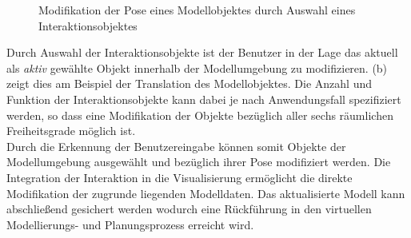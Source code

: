 \begin{figure}[!ht]
	\begin{center}
	\hspace{5mm}
	\caption{Modifikation der Pose eines Modellobjektes durch Auswahl eines Interaktionsobjektes}
	\label{fig.intarrows}
	\end{center}
\end{figure}

Durch Auswahl der Interaktionsobjekte ist der Benutzer in der Lage das aktuell als \textit{aktiv} gewählte Objekt innerhalb der Modellumgebung zu modifizieren.  (b) zeigt dies am Beispiel der Translation des Modellobjektes. Die Anzahl und Funktion der Interaktionsobjekte kann dabei je nach Anwendungsfall spezifiziert werden, so dass eine Modifikation der Objekte bezüglich aller sechs räumlichen Freiheitsgrade möglich ist.\\

Durch die Erkennung der Benutzereingabe können somit Objekte der Modellumgebung ausgewählt und bezüglich ihrer Pose modifiziert werden. Die Integration der Interaktion in die Visualisierung ermöglicht die direkte Modifikation der zugrunde liegenden Modelldaten. Das aktualisierte Modell kann abschließend gesichert werden wodurch eine Rückführung in den virtuellen Modellierungs- und Planungsprozess erreicht wird.

